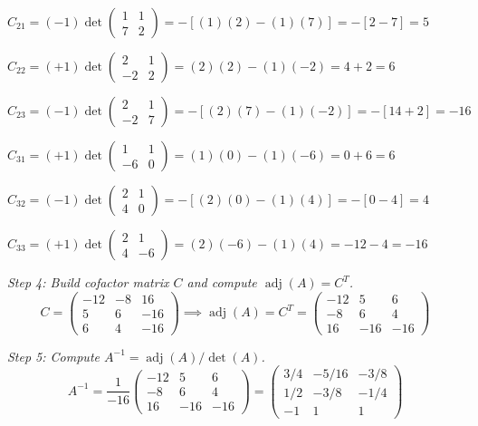 \documentclass[12pt,a4paper]{article}
\begin{document}
\(C_{21} = (-1)\det\begin{pmatrix}1&1\\7&2\end{pmatrix} = -[(1)(2)-(1)(7)] = -[2-7] = 5\)

\(C_{22} = (+1)\det\begin{pmatrix}2&1\\-2&2\end{pmatrix} = (2)(2)-(1)(-2) = 4+2 = 6\)

\(C_{23} = (-1)\det\begin{pmatrix}2&1\\-2&7\end{pmatrix} = -[(2)(7)-(1)(-2)] = -[14+2] = -16\)

\(C_{31} = (+1)\det\begin{pmatrix}1&1\\-6&0\end{pmatrix} = (1)(0)-(1)(-6) = 0+6 = 6\)

\(C_{32} = (-1)\det\begin{pmatrix}2&1\\4&0\end{pmatrix} = -[(2)(0)-(1)(4)] = -[0-4] = 4\)

\(C_{33} = (+1)\det\begin{pmatrix}2&1\\4&-6\end{pmatrix} = (2)(-6)-(1)(4) = -12-4 = -16\)

\textit{Step 4: Build cofactor matrix \(C\) and compute \(\operatorname{adj}(A) = C^{T}\).}
\[
C = \begin{pmatrix} -12 & -8 & 16 \\ 5 & 6 & -16 \\ 6 & 4 & -16 \end{pmatrix}
\implies
\operatorname{adj}(A) = C^{T} = \begin{pmatrix} -12 & 5 & 6 \\ -8 & 6 & 4 \\ 16 & -16 & -16 \end{pmatrix}
\]

\textit{Step 5: Compute \(A^{-1} = \operatorname{adj}(A)/\det(A)\).}
\[
A^{-1} = \frac{1}{-16}\begin{pmatrix} -12 & 5 & 6 \\ -8 & 6 & 4 \\ 16 & -16 & -16 \end{pmatrix}
= \begin{pmatrix} 3/4 & -5/16 & -3/8 \\ 1/2 & -3/8 & -1/4 \\ -1 & 1 & 1 \end{pmatrix}
\]
\end{document}
